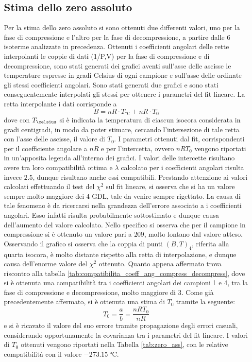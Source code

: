\documentclass[a4paper,11pt,oneside]{article}
\begin{document}
\subsection{Stima dello zero assoluto}
Per la stima dello zero assoluto si sono ottenuti due differenti valori, uno per la fase di compressione e l'altro per la fase di decompressione, a partire dalle 6 isoterme analizzate in precedenza.
Ottenuti i coefficienti angolari delle rette interpolanti le coppie di dati (1/P,V) per la fase di compressione e di decompressione, sono stati generati dei grafici aventi sull'asse delle ascisse le temperature espresse in gradi Celsius di ogni campione e sull'asse delle ordinate gli stessi coefficienti angolari. Sono stati generati due grafici e sono stati conseguentemente interpolati gli stessi per ottenere i parametri del fit lineare. La retta interpolante i dati corrisponde a 
\begin{equation*}
    B=n R \cdot T_{\si{\celsius}} + n R \cdot T_{0}
\end{equation*}
dove con $T_{\celsius}$ si è indicata la temperatura di ciascun isocora considerata in gradi centigradi, in modo da poter stimare, cercando l'intersezione di tale retta con l'asse delle ascisse, il valore di $T_0$.
I parametri ottenuti dal fit, corrispondenti per il coefficiente angolare a $n R$ e per l'intercetta, ovvero $n R T_0$  vengono riportati in un'apposita legenda all'interno dei grafici. I valori delle intercette risultano avere tra loro compatibilità ottima e $\lambda$ calcolato per i coefficienti angolari risulta invece $2.5$, dunque risultano anche essi compatibili. Prestando attenzione ai valori calcolati effettuando il test del $\chi^2$ sul fit lineare, si osserva che si ha un valore sempre molto maggiore dei 4 GDL, tale da venire sempre rigettato. La causa di tale fenomeno è da ricercarsi nella grandezza dell'errore associato a i coefficienti angolari. Esso infatti risulta probabilmente sottostimato e dunque causa dell'aumento del valore calcolato.  Nello specifico si osserva che per il campione in compressione si è ottenuto un valore pari a $209$, molto lontano dal valore atteso.
Osservando il grafico si osserva che la coppia di punti $(B,T)_4$, riferita alla quarta isocora, è molto distante rispetto alla retta di interpolazione, e dunque causa dell'enorme valore del $\chi^2$ ottenuto. Quanto appena affermato trova riscontro alla tabella \ref{tab:compatibilita_coeff_ang_compress_decompress}, dove si è ottenuta una compatibilità tra i coefficienti angolari dei campioni 1 e 4, tra la fase di compressione e decompressione, molto maggiore di $3$.
Come già precedentemente affermato, si è ottenuta una stima di $T_0$ tramite la seguente:
\begin{equation*}
    T_0=\frac{a}{b}=\frac{n R  T_0} {n R}
\end{equation*}
e si è ricavato il valore del suo errore tramite propagazione degli errori casuali, considerando opportunamente la covarianza tra i parametri del fit lineare.
I valori di $T_0$ ottenuti vengono riportati nella Tabella \ref{tab:zero_ass}, con le relative compatibilità con il valore $\SI{-273.15}{\celsius}$.
\end{document}

